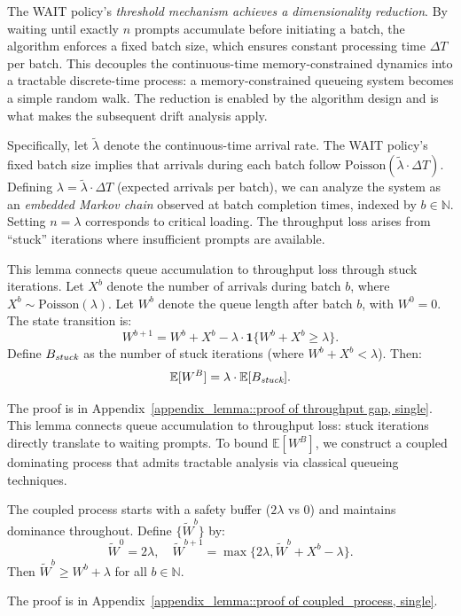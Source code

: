 The WAIT policy's \emph{threshold mechanism achieves a dimensionality reduction}. By waiting until exactly $n$ prompts accumulate before initiating a batch, the algorithm enforces a fixed batch size, which ensures constant processing time $\Delta T$ per batch. This decouples the continuous-time memory-constrained dynamics into a tractable discrete-time process: a memory-constrained queueing system becomes a simple random walk. The reduction is enabled by the algorithm design and is what makes the subsequent drift analysis apply.

Specifically, let $\tilde{\lambda}$ denote the continuous-time arrival rate. The WAIT policy's fixed batch size implies that arrivals during each batch follow $\text{Poisson}(\tilde{\lambda} \cdot \Delta T)$. Defining $\lambda = \tilde{\lambda} \cdot \Delta T$ (expected arrivals per batch), we can analyze the system as an \emph{embedded Markov chain} observed at batch completion times, indexed by $b \in \mathbb{N}$. Setting $n = \lambda$ corresponds to critical loading. The throughput loss arises from ``stuck'' iterations where insufficient prompts are available.

\begin{lemma}\label{lemma::throughput gap, single}
This lemma connects queue accumulation to throughput loss through stuck iterations. Let $X^b$ denote the number of arrivals during batch $b$, where $X^b \sim \text{Poisson}(\lambda)$. Let $W^b$ denote the queue length after batch $b$, with $W^0=0$. The state transition is:
$$W^{b+1}=W^b+X^b-\lambda\cdot \mathbf{1}\{W^b+X^b\geq \lambda\}.$$
Define $B_{\emph{stuck}}$ as the number of stuck iterations (where $W^b+X^b<\lambda$). Then:
$$\mathbb{E}[W^B]= \lambda\cdot\mathbb{E}[B_{\emph{stuck}}].$$
\end{lemma}
\noindent The proof is in Appendix~\ref{appendix_lemma::proof of throughput gap, single}. This lemma connects queue accumulation to throughput loss: stuck iterations directly translate to waiting prompts. To bound $\mathbb{E}[W^B]$, we construct a coupled dominating process that admits tractable analysis via classical queueing techniques.

\begin{lemma}\label{lem:coupled_process, single}
The coupled process starts with a safety buffer ($2\lambda$ vs 0) and maintains dominance throughout. Define $\{\tilde{W}^b\}$ by:
$$
\tilde{W}^0 = 2\lambda, \quad \tilde{W}^{b+1} = \max\{ 2\lambda, \tilde{W}^b + X^b - \lambda \}.
$$
Then $\tilde{W}^b \geq W^b + \lambda$ for all $b\in \mathbb{N}$.
\end{lemma}
\noindent The proof is in Appendix~\ref{appendix_lemma::proof of coupled_process, single}.

